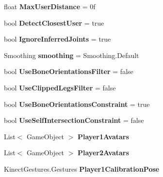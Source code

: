 \begin{DoxyCompactItemize}
\mbox{\label{class_kinect_manager_a320801e487e725635d3dfeb61589bcf0}} 
float {\bfseries Max\+User\+Distance} = 0f
\item 
\mbox{\label{class_kinect_manager_a92e937bb385e6e5f207e977a3088a0df}} 
bool {\bfseries Detect\+Closest\+User} = true
\item 
\mbox{\label{class_kinect_manager_a9df2132aca3b0eeedbd6a3ea6769bcbe}} 
bool {\bfseries Ignore\+Inferred\+Joints} = true
\item 
\mbox{\label{class_kinect_manager_af826888df34de5aee73763244f578bb7}} 
Smoothing {\bfseries smoothing} = Smoothing.\+Default
\item 
\mbox{\label{class_kinect_manager_a33edc6af031dd7911da68e01f9b5afbe}} 
bool {\bfseries Use\+Bone\+Orientations\+Filter} = false
\item 
\mbox{\label{class_kinect_manager_a185b7df9ffd5b4a3d87d48455a1ed5b7}} 
bool {\bfseries Use\+Clipped\+Legs\+Filter} = false
\item 
\mbox{\label{class_kinect_manager_acb96553f28871e4b8ad885fa0dab4bf8}} 
bool {\bfseries Use\+Bone\+Orientations\+Constraint} = true
\item 
\mbox{\label{class_kinect_manager_a9400057e02fd653f5ae4fadaef57ed1e}} 
bool {\bfseries Use\+Self\+Intersection\+Constraint} = false
\item 
\mbox{\label{class_kinect_manager_a5b7488faae7c2110ec04ca0f62fabeb2}} 
List$<$ Game\+Object $>$ {\bfseries Player1\+Avatars}
\item 
\mbox{\label{class_kinect_manager_a08198215025975998679474f46df1546}} 
List$<$ Game\+Object $>$ {\bfseries Player2\+Avatars}
\item 
\mbox{\label{class_kinect_manager_a35ecac746973e3cf60734eda5f3ff7a2}} 
Kinect\+Gestures.\+Gestures {\bfseries Player1\+Calibration\+Pose}
\item 

\end{DoxyCompactItemize}
